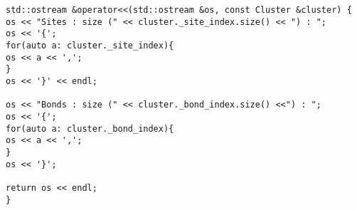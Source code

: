 \begin{lstlisting}[style=CStyle]
std::ostream &operator<<(std::ostream &os, const Cluster &cluster) {
os << "Sites : size (" << cluster._site_index.size() << ") : ";
os << '{';
for(auto a: cluster._site_index){
os << a << ',';
}
os << '}' << endl;

os << "Bonds : size (" << cluster._bond_index.size() <<") : ";
os << '{';
for(auto a: cluster._bond_index){
os << a << ',';
}
os << '}';

return os << endl;
}
\end{lstlisting}
